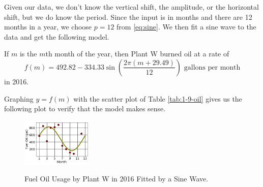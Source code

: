 Given our data, we don't know the vertical shift, the amplitude, or the horizontal shift, but we do know the period. Since the input is in months and there are 12 months in a year, we choose $p = 12$ from \ref{eq:sine}. We then fit a sine wave to the data and get the following model.

If $m$ is the $m$th month of the year, then Plant W burned oil at a rate of
$$f(m) = 492.82 - 334.33\sin\left(\frac{2\pi(m+29.49)}{12} \right) \mbox{ gallons per month}$$
in 2016.

Graphing $y=f(m)$ with the scatter plot of Table \ref{tab:1-9-oil} gives us the following plot to verify that the model makes sense.
\begin{figure}[!ht]
    \centering
    \includegraphics[width=0.3\textwidth]{img/chap1/sec1-9/fig1-9-oil-curve.png}\\
    \caption{Fuel Oil Usage by Plant W in 2016 Fitted by a Sine Wave.}
    \label{fig:1-9-oil-curve}
\end{figure}
